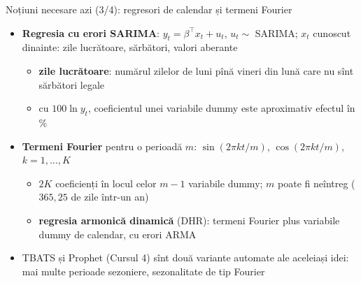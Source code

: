 \begin{frame}{Noțiuni necesare azi (3/4): regresori de calendar și termeni Fourier}
\itemsize{\small}
\begin{itemize}
    \item \textbf{Regresia cu erori SARIMA}: $y_t = \beta^\top x_t + u_t$, $u_t \sim$ SARIMA; $x_t$ cunoscut dinainte: zile lucrătoare, sărbători, valori aberante
    \begin{itemize}
        \item \textbf{zile lucrătoare}: numărul zilelor de luni pînă vineri din lună care nu sînt sărbători legale
        \item cu $100\ln y_t$, coeficientul unei variabile dummy este aproximativ efectul în \%
    \end{itemize}
    \item \textbf{Termeni Fourier} pentru o perioadă $m$: $\sin(2\pi kt/m)$, $\cos(2\pi kt/m)$, $k = 1, \dots, K$
    \begin{itemize}
        \item $2K$ coeficienți în locul celor $m - 1$ variabile dummy; $m$ poate fi neîntreg ($365{,}25$ de zile într-un an)
        \item \textbf{regresia armonică dinamică} (DHR): termeni Fourier plus variabile dummy de calendar, cu erori ARMA
    \end{itemize}
    \item TBATS și Prophet (Cursul 4) sînt două variante automate ale aceleiași idei: mai multe perioade sezoniere, sezonalitate de tip Fourier
\end{itemize}
\end{frame}

